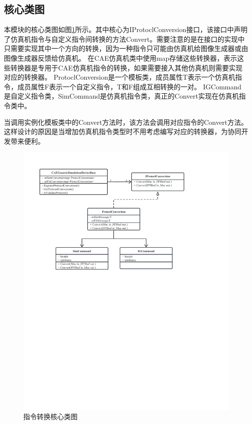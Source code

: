 \subsection{核心类图}
\par
本模块的核心类图如图\ref{module22}所示。其中核心为IProtoclConversion接口，该接口中声明了仿真机指令与自定义指令间转换的方法Convert。需要注意的是在接口的实现中只需要实现其中一个方向的转换，因为一种指令只可能由仿真机给图像生成器或由图像生成器反馈给仿真机。
在CAE仿真机类中使用map存储这些转换器，表示这些转换器是专用于CAE仿真机指令的转换，如果需要接入其他仿真机则需要实现对应的转换器。
ProtoclConversion是一个模板类，成员属性T表示一个仿真机指令，成员属性F表示一个自定义指令，T和F组成互相转换的一对。
IGCommand是自定义指令类，SimCommand是仿真机指令类，真正的Convert实现在仿真机指令类中。
\par
当调用实例化模板类中的Convert方法时，该方法会调用对应指令的Convert方法。
这样设计的原因是当增加仿真机指令类型时不用考虑编写对应的转换器，为协同开发带来便利。

\begin{figure}[h!]
    \begin{center}
        \includegraphics[width=\textwidth]{pictures/classdiagram2.pdf}
        \caption{指令转换核心类图}
        \label{module22}
    \end{center}
\end{figure}
